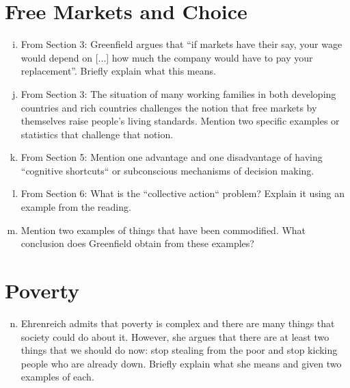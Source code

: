 \documentclass{article}
\begin{document}
\section*{Free Markets and Choice}
\begin{enumerate}[a)]
  \setcounter{enumi}{8}
  \item From Section 3: Greenfield argues that ``if markets have their say, your wage would depend on [...] how much the company would have to pay your replacement''. Briefly explain what this means.
  \item From Section 3: The situation of many working families in both developing countries and rich countries challenges the notion that free markets by themselves raise people's living standards. Mention two specific examples or statistics that challenge that notion.
  \item From Section 5: Mention one advantage and one disadvantage of having ``cognitive shortcuts`` or subconscious mechanisms of decision making.
  \item From Section 6: What is the ``collective action`` problem? Explain it using an example from the reading.
  \item Mention two examples of things that have been commodified. What conclusion does Greenfield obtain from these examples?
\end{enumerate}

\section*{Poverty}
\begin{enumerate}[a)]
  \setcounter{enumi}{13}
  \item Ehrenreich admits that poverty is complex and there are many things that society could do about it. However, she argues that there are at least two things that we should do now: stop stealing from the poor and stop kicking people who are already down. Briefly explain what she means and given two examples of each.
\end{enumerate}
\end{document}
